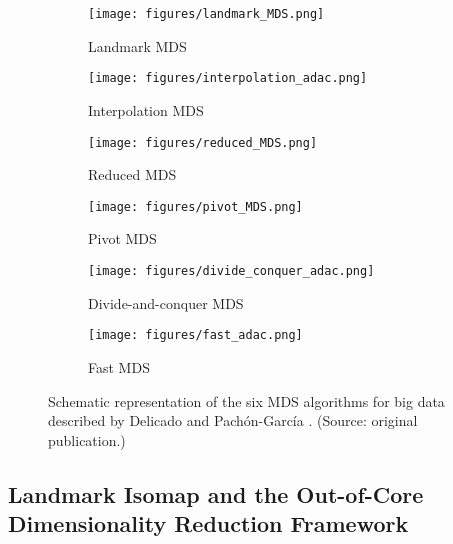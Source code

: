 \begin{figure}[ht]
    \centering
    \captionsetup[subfigure]{labelformat=empty}

    \begin{subfigure}[t]{0.3\textwidth}
        \centering
        \texttt{[image: figures/landmark\_MDS.png]}
        \caption{Landmark MDS}
        \label{fig:landmark_MDS}
    \end{subfigure}
    \hfill
    \begin{subfigure}[t]{0.3\textwidth}
        \centering
        \texttt{[image: figures/interpolation\_adac.png]}
        \caption{Interpolation MDS}
        \label{fig:interpolation_MDS}
    \end{subfigure}
    \hfill
    \begin{subfigure}[t]{0.3\textwidth}
        \centering
        \texttt{[image: figures/reduced\_MDS.png]}
        \caption{Reduced MDS}
        \label{fig:reduced_MDS}
    \end{subfigure}

    \begin{subfigure}[t]{0.3\textwidth}
        \centering
        \texttt{[image: figures/pivot\_MDS.png]}
        \caption{Pivot MDS}
        \label{fig:pivot_MDS}
    \end{subfigure}
    \hfill
    \begin{subfigure}[t]{0.3\textwidth}
        \centering
        \texttt{[image: figures/divide\_conquer\_adac.png]}
        \caption{Divide-and-conquer MDS}
        \label{fig:divide_conquer_MDS}
    \end{subfigure}
    \hfill
    \begin{subfigure}[t]{0.3\textwidth}
        \centering
        \texttt{[image: figures/fast\_adac.png]}
        \caption{Fast MDS}
        \label{fig:fast_MDS}
    \end{subfigure}
    
    \caption{Schematic representation of the six MDS algorithms for big data described by Delicado and Pachón-García \cite{Delicado2024a}. (Source: original publication.)}
    \label{fig:bigmds}
\end{figure}

\subsection{Landmark Isomap and the Out-of-Core Dimensionality Reduction Framework}


